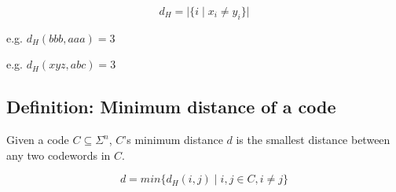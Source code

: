 \documentclass[12pt]{article}
\begin{document}
$$d_H = \lvert \{ i \mid x_i \neq y_i \} \rvert$$

e.g. $d_H(bbb, aaa) = 3$

e.g. $d_H(xyz, abc) = 3$

\subsection{Definition: Minimum distance of a code}
Given a code $C \subseteq \Sigma^n$, $C$'s minimum distance $d$ is the smallest distance between any two codewords in $C$.

$$d = min \{d_H(i,j) \mid i,j \in C, i \neq j \}$$


\break

    
\end{document}
